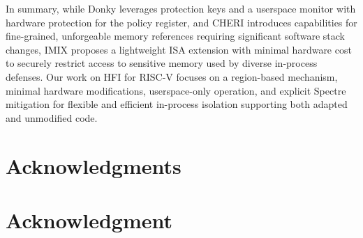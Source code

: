 \documentclass[conference,compsoc]{IEEEtran}
\begin{document}
In summary, while Donky leverages protection keys and a userspace monitor with hardware protection for the policy register, and CHERI introduces capabilities for fine-grained, unforgeable memory references requiring significant software stack changes, IMIX proposes a lightweight ISA extension with minimal hardware cost to securely restrict access to sensitive memory used by diverse in-process defenses. Our work on HFI for RISC-V focuses on a region-based mechanism, minimal hardware modifications, userspace-only operation, and explicit Spectre mitigation for flexible and efficient in-process isolation supporting both adapted and unmodified code.





\ifCLASSOPTIONcompsoc
  \section*{Acknowledgments}
\else
  \section*{Acknowledgment}
\fi






\end{document}
